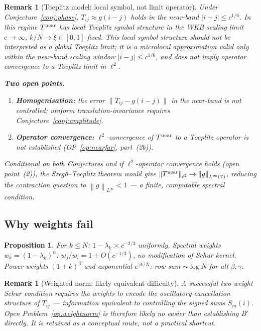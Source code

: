 \documentclass[12pt,a4paper]{article}
\newtheorem{proposition}[theorem]{Proposition}
\newtheorem{remark}[theorem]{Remark}
\newcommand{\norm}[1]{\left\|#1\right\|}
\begin{document}
\begin{remark}[Toeplitz model: local symbol, not limit operator]
\label{rem:toeplitz}
Under Conjecture~\ref{conj:phase},
$T_{ij}\approx g(i-j)$ holds in the near-band
$|i-j|\leq c^{1/6}$.
In this regime $T^{\rm near}$ has \emph{local Toeplitz symbol
structure} in the WKB scaling limit $c\to\infty$,
$k/N\to\xi\in[0,1]$ fixed.
This local symbol structure should not be interpreted as a
global Toeplitz limit; it is a microlocal approximation valid
only within the near-band scaling window $|i-j|\leq c^{1/6}$,
and does not imply operator convergence to a Toeplitz limit
in $\ell^2$.

\medskip\noindent\textbf{Two open points.}
\begin{enumerate}[nosep,label=(\arabic*)]
  \item \textbf{Homogenisation:}
        the error $\|T_{ij}-g(i-j)\|$ in the near-band
        is not controlled; uniform translation-invariance
        requires Conjecture~\ref{conj:amplitude}.
  \item \textbf{Operator convergence:}
        $\ell^2$-convergence of $T^{\rm near}$ to a Toeplitz
        operator is not established
        (OP~\ref{op:nearfar}, part~(2b)).
\end{enumerate}
Conditional on both Conjectures and if $\ell^2$-operator convergence
holds (open point~(2)), the Szeg\H{o}--Toeplitz theorem
\emph{would give}
$\norm{T^{\rm near}}_{\ell^2}\to\norm{g}_{L^\infty(\mathbb{T})}$,
reducing the contraction question to $\norm{g}_{L^\infty}<1$
--- a finite, computable spectral condition.
\end{remark}

\subsection{Why weights fail}
\label{sec:spectral_weights}

\begin{proposition}\label{prop:spectral_weight_fail}
For $k\leq N$: $1-\lambda_k\asymp c^{-2/3}$ uniformly.
Spectral weights $w_k=(1-\lambda_k)^\alpha$:
$w_j/w_i=1+O(c^{-1/3})$, no modification of Schur kernel.
Power weights $(1+k)^\beta$ and exponential $e^{\gamma k/N}$:
row sum $\sim\log N$ for all $\beta,\gamma$.
\end{proposition}

\begin{remark}[Weighted norm: likely equivalent difficulty]
\label{rem:weightnorm_hardness}
A successful two-weight Schur condition requires the weights
to encode the oscillatory cancellation structure of $T_{ij}$
--- information equivalent to controlling the signed sums $S_m(i)$.
Open Problem~\ref{op:weightnorm} is therefore likely no easier
than establishing B$'$ directly.
It is retained as a conceptual route, not a practical shortcut.
\end{remark}
\end{document}
